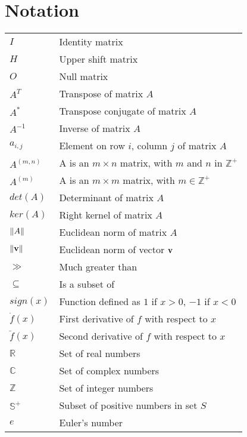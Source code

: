 \section*{Notation}

\begin{table}[h!]
    \begin{tabularx}{\textwidth}{@{}p{}X@{}}
        \toprule
        $I$ & Identity matrix \\
        $H$ & Upper shift matrix \\
        $O$ & Null matrix \\
        $A^T$ & Transpose of matrix $A$ \\
        $A^*$ & Transpose conjugate of matrix $A$ \\
        $A^{-1}$ & Inverse of matrix $A$ \\
        $a_{i, j}$ & Element on row $i$, column $j$ of matrix $A$\\
        $A^{(m, n)}$ & A is an \(m \times n\) matrix, with $m$ and $n$ in $\mathbb{Z}^+$ \\
        $A^{(m)}$ & A is an \(m \times m\) matrix, with $m \in \mathbb{Z}^+$ \\
        $det(A)$ & Determinant of matrix $A$ \\
        $ker(A)$ & Right kernel of matrix $A$ \\
        $\norm{A}$ & Euclidean norm of matrix $A$ \\
        $\norm{\vb{v}}$ & Euclidean norm of vector $\vb{v}$ \\
        $\gg$ & Much greater than \\
        $\subseteq$ & Is a subset of \\
        $sign(x)$ & Function defined as $1$ if $x > 0$, $-1$ if $x < 0$ \\
        $\dot{f}(x)$ & First derivative of $f$ with respect to $x$ \\
        $\ddot{f}(x)$ & Second derivative of $f$ with respect to $x$\\
        $\mathbb{R}$ & Set of real numbers \\
        $\mathbb{C}$ & Set of complex numbers \\
        $\mathbb{Z}$ & Set of integer numbers \\
        $\mathbb{S}^+$ & Subset of positive numbers in set $S$ \\
        $e$ & Euler's number \\
        \bottomrule
    \end{tabularx}
\end{table}